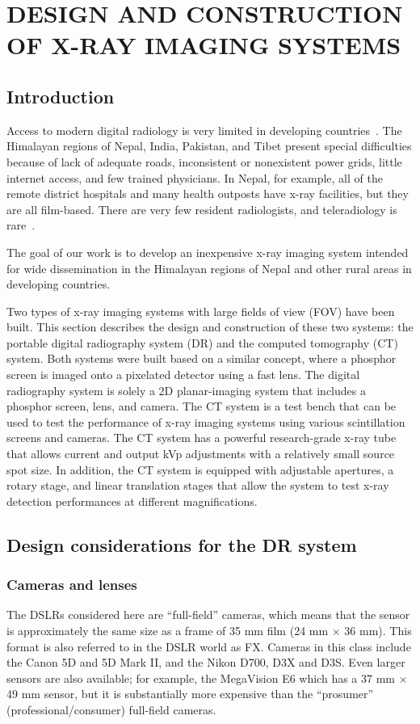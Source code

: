 \chapter{DESIGN AND CONSTRUCTION OF X-RAY IMAGING SYSTEMS}
\label{chap:design_construction}

\section{Introduction}
Access to modern digital radiology is very limited in developing countries~\citep{telehealth2009}. The Himalayan regions of Nepal, India, Pakistan, and Tibet present special difficulties because of lack of adequate roads, inconsistent or nonexistent power grids, little internet access, and few trained physicians. In Nepal, for example, all of the remote district hospitals and many health outposts have x-ray facilities, but they are all film-based. There are very few resident radiologists, and teleradiology is rare~\citep{telehealth2009, Graham2003}.

The goal of our work is to develop an inexpensive x-ray imaging system intended for wide dissemination in the Himalayan regions of Nepal and other rural areas in developing countries.

Two types of x-ray imaging systems with large fields of view (FOV) have been built.  This section describes the design and construction of these two systems: the portable digital radiography system (DR) and the computed tomography (CT) system.  Both systems were built based on a similar concept, where a phosphor screen is imaged onto a pixelated detector using a fast lens.  The digital radiography system is solely a 2D planar-imaging system that includes a phosphor screen, lens, and camera.  The CT system is a test bench that can be used to test the performance of x-ray imaging systems using various scintillation screens and cameras.  The CT system has a powerful research-grade x-ray tube that allows current and output kVp adjustments with a relatively small source spot size.  In addition, the CT system is equipped with adjustable apertures, a rotary stage, and linear translation stages that allow the system to test x-ray detection performances at different magnifications.

\section{Design considerations for the DR system}
\label{sect:design_considerations_for_DR}
\subsection{Cameras and lenses}
\label{subsect:camera_lenses}
The DSLRs considered here are ``full-field'' cameras, which means that the sensor is approximately the same size as a frame of 35 mm film (24 mm $\times$ 36 mm).  This format is also referred to in the DSLR world as FX. Cameras in this class include the Canon 5D and 5D Mark II, and the Nikon D700, D3X and D3S. Even larger sensors are also available; for example, the MegaVision E6 which has a 37 mm $\times$ 49 mm sensor, but it is substantially more expensive than the ``prosumer'' (professional/consumer) full-field cameras.

